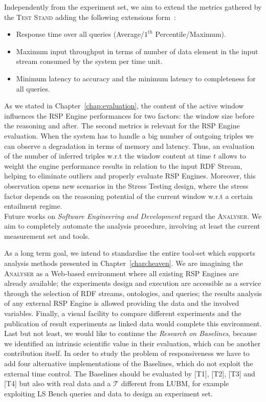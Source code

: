 Independently from the experiment set, we aim to extend the metrics gathered by the \textsc{Test Stand} adding the following extensions form~\cite{DBLP:conf/esws/ScharrenbachUMVB13}:
\begin{itemize}
\item Response time over all queries (Average/$1^{th}$ Percentile/Maximum).
\item Maximum input throughput in terms of number of data element in the input stream consumed by the system per time unit.
\item Minimum latency to accuracy and the minimum latency to completeness for all queries.
\end{itemize}

As we stated in Chapter~\ref{chap:evaluation}, the content of the active window influences the RSP Engine performances for two factors: the window size before the reasoning and after. The second metrics is relevant for the RSP Engine evaluation. When the system has to handle a big number of outgoing triples we can observe a degradation in terms of memory and latency. Thus, an evaluation of the number of inferred triples w.r.t the window content at time $t$ allows to weight the engine performance results in relation to the input RDF Stream, helping to eliminate outliers and properly evaluate RSP Engines. Moreover, this observation opens new scenarios in the Stress Testing design, where the stress factor depends on the reasoning potential of the current window w.r.t a certain entailment regime.\\

\noindent Future works on \textit{Software Engineering and Development} regard the \textsc{Analyser}.  We aim to completely automate the analysis procedure, involving at least the current measurement set and tools. 

As a long term goal, we intend to standardise the entire tool-set which supports analysis methods presented in Chapter~\ref{chap:heaven}. We are imagining the \textsc{Analyser} as a Web-based environment where all existing RSP Engines are already available; the experiments design and execution are accessible as a service through the selection of RDF streams, ontologies, and queries; the results analysis of any external RSP Engine is allowed providing the data and the involved variables. Finally, a visual facility to compare different experiments and the publication of result experiments as linked data would complete this environment. \\


\noindent Last but not least, we would like to continue the \textit{Research on Baselines}, because we identified an intrinsic scientific value in their evaluation, which can be another contribution itself. In order to study the problem of responsiveness we have to add four alternative implementations of the Baselines, which do not exploit the external time control. The Baselines should be evaluated by [T1], [T2], [T3] and [T4] but also with real data and a $\mathcal{T}$ different from LUBM, for example exploiting LS Bench queries and data to design an experiment set. 
